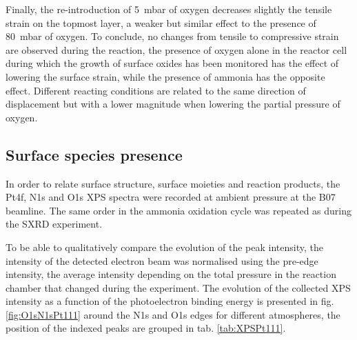 Finally, the re-introduction of \qty{5}{\milli\bar} of oxygen decreases slightly the tensile strain on the topmost layer, a weaker but similar effect to the presence of \qty{80}{\milli\bar} of oxygen.
To conclude, no changes from tensile to compressive strain are observed during the reaction, the presence of oxygen alone in the reactor cell during which the growth of surface oxides has been monitored has the effect of lowering the surface strain, while the presence of ammonia has the opposite effect.
Different reacting conditions are related to the same direction of displacement but with a lower magnitude when lowering the partial pressure of oxygen.

\subsection{Surface species presence}

In order to relate surface structure, surface moieties and reaction products, the Pt4f, N1s and O1s XPS spectra were recorded at ambient pressure at the B07 beamline.
The same order in the ammonia oxidation cycle was repeated as during the SXRD experiment.

To be able to qualitatively compare the evolution of the peak intensity, the intensity of the detected electron beam was normalised using the pre-edge intensity, the average intensity depending on the total pressure in the reaction chamber \parencite{Willmott} that changed during the experiment.
The evolution of the collected XPS intensity as a function of the photoelectron binding energy is presented in fig. \ref{fig:O1sN1sPt111} around the N1s and O1s edges for different atmospheres, the position of the indexed peaks are grouped in tab. \ref{tab:XPSPt111}.

